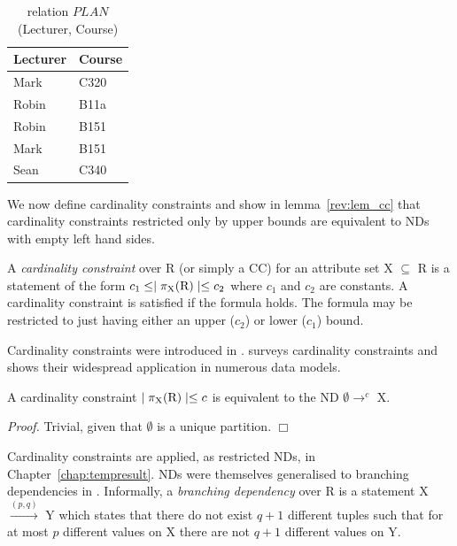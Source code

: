 {\line
\begin{table}[ht]
\begin{center}
\begin{tabular}{||l|l||} \hline
{\bf Lecturer} & {\bf Course} \\ \hline
 Mark &  C320 \\
 Robin & B11a \\
 Robin & B151 \\ 
 Mark  & B151 \\ 
 Sean  & C340 \\ \hline
\end{tabular}
\end{center}
\caption{\label{tbl:1.0} relation $PLAN$(Lecturer, Course)} 
\end{table}
}

We now define cardinality constraints and show in
lemma~\ref{rev:lem_cc} that cardinality constraints restricted only by
upper bounds are equivalent to NDs with empty left hand sides.


\begin{definition}
\begin{rm}
A {\em cardinality constraint} over R (or simply a CC) for an
attribute set X $\subseteq$ R
is a statement of the form $c_1 \le \mid \pi_{\rm X}({\rm R}) \mid \le
c_2$ where 
$c_1$ and $c_2$ are constants. A cardinality constraint is satisfied
if the formula holds. The formula may be restricted to just having
either an upper ($c_2$) or lower ($c_1$) bound.
\end{rm}
\end{definition}
\medskip

Cardinality constraints were introduced in \cite{kan80}. \cite{lew93}
surveys cardinality constraints and shows their widespread application
in numerous data models. 

\begin{lemma}\label{rev:lem_cc}
\begin{rm}
A cardinality constraint $\mid \pi_{\rm X}({\rm R}) \mid \le c$ is
equivalent to 
the ND $\emptyset \to^c$ X.
\end{rm}
\end{lemma}


{\em Proof.} Trivial, given that $\emptyset$ is a unique
partition. $\Box$

Cardinality constraints are applied, as restricted NDs, in
Chapter~\ref{chap:tempresult}. NDs were themselves generalised to branching
dependencies in \cite{dks92}. Informally, a {\em branching dependency}
over R 
is a statement X $\stackrel{(p,q)}{\rightarrow}$ Y which
states that there do not exist $q+1$ different tuples such that for at
most $p$ different values on X there are not $q+1$ different values on
Y. 

